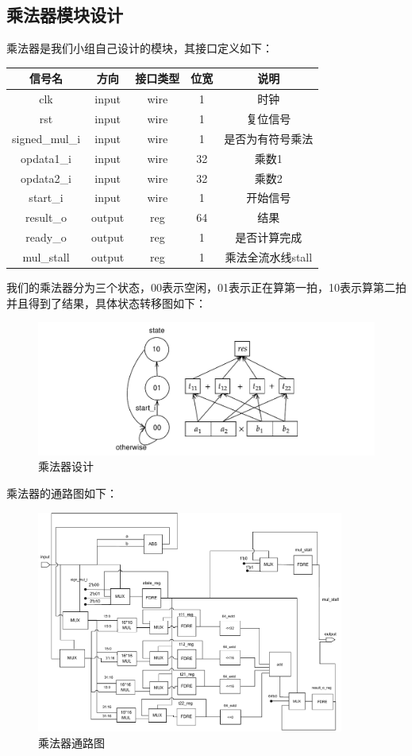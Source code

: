\subsection{乘法器模块设计}
乘法器是我们小组自己设计的模块，其接口定义如下：
\begin{table}[H]
    \centering
    \begin{tabular}{ccccc}
        \hline
        信号名 & 方向 & 接口类型 & 位宽 & 说明 \\\hline
        clk & input & wire & 1 & 时钟 \\ 
        rst & input & wire & 1 & 复位信号 \\ 
        signed\_mul\_i & input & wire & 1 & 是否为有符号乘法 \\ 
        opdata1\_i & input & wire & 32 & 乘数1 \\ 
        opdata2\_i & input & wire & 32 & 乘数2 \\ 
        start\_i & input & wire & 1 & 开始信号 \\ 
        result\_o & output & reg & 64 & 结果 \\ 
        ready\_o & output & reg & 1 & 是否计算完成 \\ 
        mul\_stall & output & reg & 1 & 乘法全流水线stall \\ 

        \hline
    \end{tabular}
\end{table}

我们的乘法器分为三个状态，00表示空闲，01表示正在算第一拍，10表示算第二拍并且得到了结果，具体状态转移图如下：
\begin{figure}[H]
\centering
\includegraphics[width=\textwidth]{image/mul.pdf}
\caption{乘法器设计}
\end{figure}

乘法器的通路图如下：
\begin{figure}[H]
\centering
\includegraphics[width=0.9\textwidth]{image/mul2.pdf}
\caption{乘法器通路图}
\end{figure}